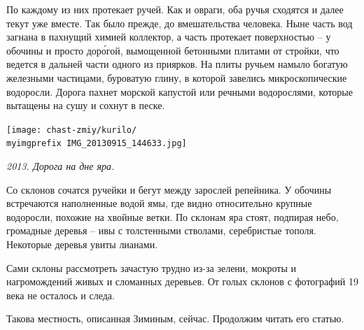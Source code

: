 По каждому из них протекает ручей. Как и овраги, оба ручья сходятся и далее текут уже вместе. Так было прежде, до вмешательства человека. Ныне часть вод загнана в пахнущий химией коллектор, а часть протекает поверхностью – у обочины и просто дор\'огой, вымощенной бетонными плитами от стройки, что ведется в дальней части одного из приярков. На плиты ручьем намыло богатую железными частицами, буроватую глину, в которой завелись микроскопические водоросли. Дорога пахнет морской капустой или речными водорослями, которые вытащены на сушу и сохнут в песке.









\begin{center}
\texttt{[image: chast-zmiy/kurilo/\\myimgprefix IMG\_20130915\_144633.jpg]}

\textit{2013. Дорога на дне яра.}
\end{center}

Со склонов сочатся ручейки и бегут между зарослей репейника. У обочины встречаются наполненные водой ямы, где видно относительно крупные водоросли, похожие на хвойные ветки. По склонам яра стоят, подпирая небо, громадные деревья – ивы с толстенными стволами, серебристые тополя. Некоторые деревья увиты лианами.

Сами склоны рассмотреть зачастую трудно из-за зелени, мокроты и нагромождений живых и сломанных деревьев. От голых склонов с фотографий 19 века не осталось и следа.

Такова местность, описанная Зиминым, сейчас. Продолжим читать его статью.

